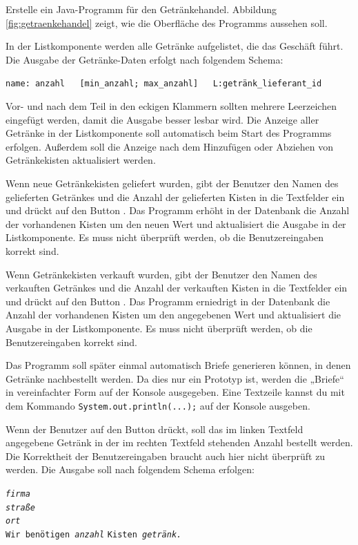 \begin{compactenum}[a)]
\item Erstelle ein Java-Programm für den Getränkehandel. Abbildung
\ref{fig:getraenkehandel} zeigt, wie die Oberfläche des Programms
aussehen soll.
 
In der Listkomponente werden alle Getränke aufgelistet, die das Geschäft führt. Die Ausgabe der
Getränke-Daten erfolgt nach folgendem Schema:

\verb|name: anzahl   [min_anzahl; max_anzahl]   L:getränk_lieferant_id|

Vor- und nach dem Teil in den eckigen Klammern sollten mehrere Leerzeichen
eingefügt werden, damit die Ausgabe besser lesbar wird. Die Anzeige aller
Getränke in der Listkomponente soll automatisch beim Start des Programms
erfolgen. Außerdem soll die Anzeige nach dem Hinzufügen oder Abziehen von
Getränkekisten aktualisiert werden.

Wenn neue Getränkekisten geliefert wurden, gibt der Benutzer den Namen des
gelieferten Getränkes und die Anzahl der gelieferten Kisten in die Textfelder
ein und drückt auf den Button . Das Programm erhöht in der
Datenbank die Anzahl der vorhandenen Kisten um den neuen Wert und aktualisiert
die Ausgabe in der Listkomponente. Es muss nicht überprüft werden, ob die
Benutzereingaben korrekt sind.

Wenn Getränkekisten verkauft wurden, gibt der Benutzer den Namen des verkauften
Getränkes und die Anzahl der verkauften Kisten in die Textfelder ein und drückt
auf den Button . Das Programm erniedrigt in der Datenbank die
Anzahl der vorhandenen Kisten um den angegebenen Wert und aktualisiert die
Ausgabe in der Listkomponente. Es muss nicht überprüft werden, ob die
Benutzereingaben korrekt sind.

Das Programm soll später einmal automatisch Briefe generieren können, in denen
Getränke nachbestellt werden. Da dies nur ein Prototyp ist, werden die „Briefe“
in vereinfachter Form auf der Konsole ausgegeben. Eine Textzeile kannst du mit
dem Kommando \lstinline|System.out.println(...);| auf der Konsole ausgeben.

Wenn der Benutzer auf den Button  drückt, soll das im
linken Textfeld angegebene Getränk in der im rechten Textfeld stehenden Anzahl
bestellt werden. Die Korrektheit der Benutzereingaben braucht auch hier nicht
überprüft zu werden. Die Ausgabe soll nach folgendem Schema erfolgen:

\texttt{\slshape{firma}\\
\slshape{straße}\\
\slshape{ort}}\\
\texttt{Wir benötigen \slshape{anzahl}} \texttt{Kisten \slshape{getränk}.}


\end{compactenum}
